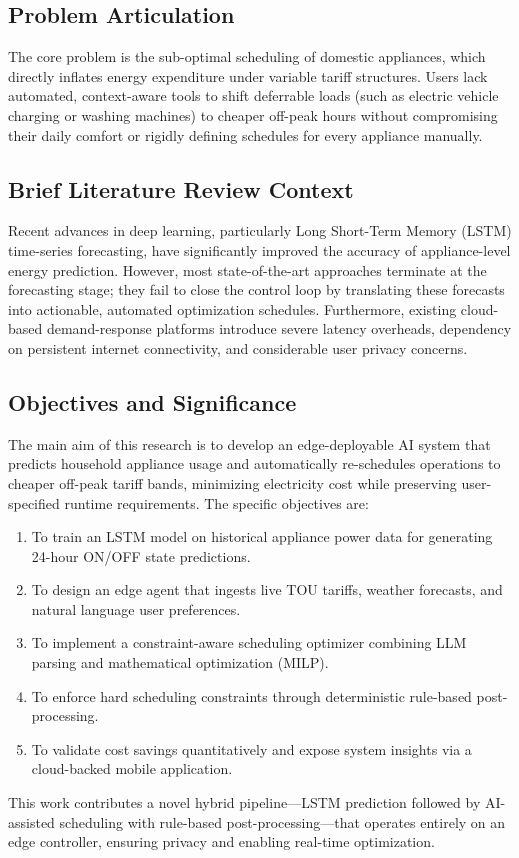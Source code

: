 \documentclass[12pt, a4paper]{article}
\begin{document}
\subsection{Problem Articulation}
The core problem is the sub-optimal scheduling of domestic appliances, which directly inflates energy expenditure under variable tariff structures. Users lack automated, context-aware tools to shift deferrable loads (such as electric vehicle charging or washing machines) to cheaper off-peak hours without compromising their daily comfort or rigidly defining schedules for every appliance manually. 

\subsection{Brief Literature Review Context}
Recent advances in deep learning, particularly Long Short-Term Memory (LSTM) time-series forecasting, have significantly improved the accuracy of appliance-level energy prediction. However, most state-of-the-art approaches terminate at the forecasting stage; they fail to close the control loop by translating these forecasts into actionable, automated optimization schedules. Furthermore, existing cloud-based demand-response platforms introduce severe latency overheads, dependency on persistent internet connectivity, and considerable user privacy concerns.

\subsection{Objectives and Significance}
The main aim of this research is to develop an edge-deployable AI system that predicts household appliance usage and automatically re-schedules operations to cheaper off-peak tariff bands, minimizing electricity cost while preserving user-specified runtime requirements. The specific objectives are:
\begin{enumerate}
    \item To train an LSTM model on historical appliance power data for generating 24-hour ON/OFF state predictions.
    \item To design an edge agent that ingests live TOU tariffs, weather forecasts, and natural language user preferences.
    \item To implement a constraint-aware scheduling optimizer combining LLM parsing and mathematical optimization (MILP).
    \item To enforce hard scheduling constraints through deterministic rule-based post-processing.
    \item To validate cost savings quantitatively and expose system insights via a cloud-backed mobile application.
\end{enumerate}
This work contributes a novel hybrid pipeline—LSTM prediction followed by AI-assisted scheduling with rule-based post-processing—that operates entirely on an edge controller, ensuring privacy and enabling real-time optimization.
\end{document}

